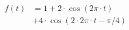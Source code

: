 \correct
\begin{center}
\begin{align*}
f(t) &= 1 + 2 \cdot \cos( 2 \pi \cdot t ) \\
&+ 4 \cdot \cos( 2 \cdot 2 \pi \cdot t - \pi/4)
\end{align*}
\end{center}
